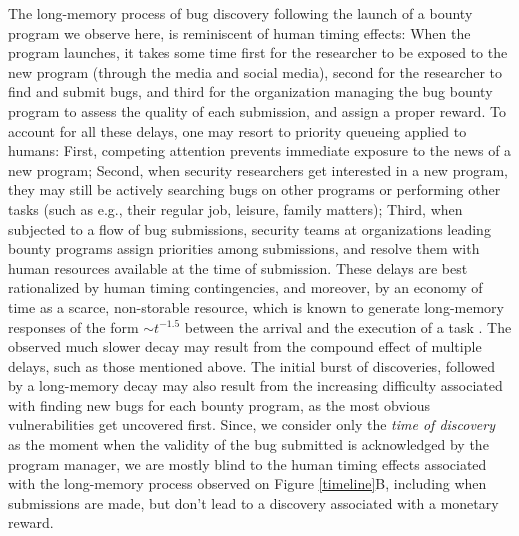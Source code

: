 The long-memory process of bug discovery following the launch of a bounty program we observe here, is reminiscent of human timing effects: When the program launches, it takes some time first for the researcher to be exposed to the new program (through the media and social media), second for the researcher to find and submit bugs, and third for the organization managing the bug bounty program to assess the quality of each submission, and assign a proper reward. To account for all these delays, one may resort to priority queueing applied to humans: First, competing attention prevents immediate exposure to the news of a new program; Second, when security researchers get interested in a new program, they may still be actively searching bugs on other programs or performing other tasks (such as e.g., their regular job, leisure, family matters); Third, when subjected to a flow of bug submissions, security teams at organizations leading bounty programs assign priorities among submissions, and resolve them with human resources available at the time of submission. These delays are best rationalized by human timing contingencies, and moreover, by an economy of time as a scarce, non-storable resource, which is known to generate long-memory responses of the form $\sim t^{-1.5}$ between the arrival and the execution of a task \cite{maillart2011quantification}. The observed much slower decay may result from the compound effect of multiple delays, such as those mentioned above. The initial burst of discoveries, followed by a long-memory decay may also result from the increasing difficulty associated with finding new bugs for each bounty program, as the most obvious vulnerabilities get uncovered first.  Since, we consider only the {\it time of discovery} as the moment when the validity of the bug submitted is acknowledged by the program manager, we are mostly blind to the human timing effects associated with the long-memory process observed on Figure \ref{timeline}B, including when submissions are made, but don't lead to a discovery associated with a monetary reward.\\



